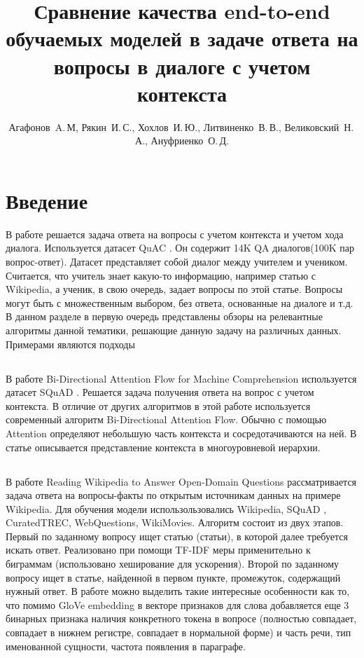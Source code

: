 \documentclass[12pt,twoside]{article}
\title
    [Сравнение качества end-to-end обучаемых моделей в задаче ответа на вопросы в диалоге с учетом контекста] %
    {Сравнение качества end-to-end обучаемых моделей в задаче ответа на вопросы в диалоге с учетом контекста}
\author
    {Агафонов~A.\,М, Рякин~И.\,С., Хохлов~И.\,Ю., Литвиненко~В.\,В., Великовский~Н.\,А., Ануфриенко~О.\,Д.} %
\begin{document}
\maketitle
\section{Введение}
В работе решается задача ответа на вопросы с учетом контекста и учетом хода диалога. Используется датасет QuAC \cite{quac}. Он содержит 14K QA диалогов(100K пар вопрос-ответ). Датасет представляет собой диалог между учителем и учеником. Считается, что учитель знает какую-то информацию, например статью с Wikipedia, а ученик, в свою очередь, задает вопросы по этой статье. Вопросы могут быть с множественным выбором, без ответа, основанные на диалоге и т.д. В данном разделе в первую очередь представлены обзоры на релевантные алгоритмы данной тематики, решающие данную задачу на различных данных. Примерами являются подходы \cite{bidaf, drqa, r-net, flowqa}
\subsection{}
  В работе Bi-Directional Attention Flow for Machine Comprehension \cite{bidaf} используется датасет SQuAD \cite{squad}. Решается задача получения ответа на вопрос с учетом контекста. В отличие от других алгоритмов в этой работе используется современный алгоритм Bi-Directional Attention Flow. Обычно с помощью Attention \cite{rectrends2018} определяют небольшую часть контекста и сосредотачиваются на ней. В статье \cite{bidaf} описывается представление контекста в многоуровневой иерархии. 
\subsection{}
В работе Reading Wikipedia to Answer Open-Domain Questions \cite{drqa} рассматривается задача ответа на вопросы-факты по открытым источникам данных на примере Wikipedia. Для обучения модели использользовались Wikipedia, SQuAD \cite{squad}, CuratedTREC, WebQuestions, WikiMovies. Алгоритм состоит из двух этапов. Первый по заданному вопросу ищет статью (статьи), в которой далее требуется искать ответ. Реализовано при помощи TF-IDF меры применительно к биграммам (использовано хеширование для ускорения). Второй по заданному вопросу ищет в статье, найденной в первом пункте, промежуток, содержащий нужный ответ. В работе можно выделить такие интересные особенности как то, что помимо GloVe embedding \cite{glove} в векторе признаков для слова добавляется еще 3 бинарных признака наличия конкретного токена в вопросе (полностью совпадает, совпадает в нижнем регистре, совпадает в нормальной форме) и часть речи, тип именованной сущности, частота появления в параграфе.   
\end{document}
